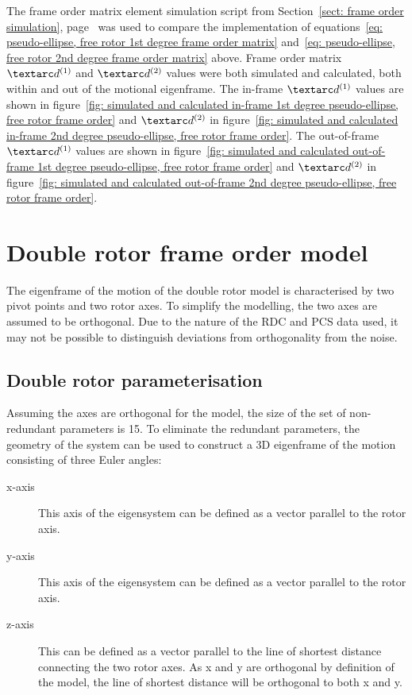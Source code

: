 The frame order matrix element simulation script from Section~\ref{sect: frame order simulation}, page~\pageref{sect: frame order simulation} was used to compare the implementation of equations~\ref{eq: pseudo-ellipse, free rotor 1st degree frame order matrix} and~\ref{eq: pseudo-ellipse, free rotor 2nd degree frame order matrix} above.
Frame order matrix $\FOone$ and $\FOtwo$ values were both simulated and calculated, both within and out of the motional eigenframe.
The in-frame $\FOone$ values are shown in figure~\ref{fig: simulated and calculated in-frame 1st degree pseudo-ellipse, free rotor frame order} and $\FOtwo$ in figure~\ref{fig: simulated and calculated in-frame 2nd degree pseudo-ellipse, free rotor frame order}.
The out-of-frame $\FOone$ values are shown in figure~\ref{fig: simulated and calculated out-of-frame 1st degree pseudo-ellipse, free rotor frame order} and $\FOtwo$ in figure~\ref{fig: simulated and calculated out-of-frame 2nd degree pseudo-ellipse, free rotor frame order}.



\section{Double rotor frame order model}

The eigenframe of the motion of the double rotor model is characterised by two pivot points and two rotor axes.
To simplify the modelling, the two axes are assumed to be orthogonal.
Due to the nature of the RDC and PCS data used, it may not be possible to distinguish deviations from orthogonality from the noise.


\subsection{Double rotor parameterisation}

Assuming the axes are orthogonal for the model, the size of the set of non-redundant parameters is 15.
To eliminate the redundant parameters, the geometry of the system can be used to construct a 3D eigenframe of the motion consisting of three Euler angles:
\begin{description}
    \item[x-axis]  This axis of the eigensystem can be defined as a vector parallel to the  rotor axis.
    \item[y-axis]  This axis of the eigensystem can be defined as a vector parallel to the  rotor axis.
    \item[z-axis]  This can be defined as a vector parallel to the line of shortest distance connecting the two rotor axes.  As x and y are orthogonal by definition of the model, the line of shortest distance will be orthogonal to both x and y.
\end{description}

